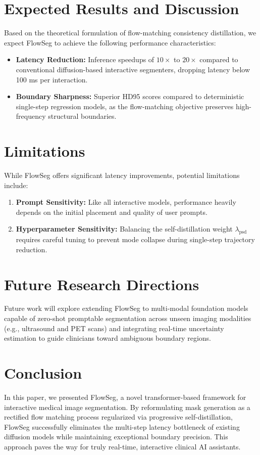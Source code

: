 \documentclass[10.1005,journal]{IEEEtran}
\begin{document}
\section{Expected Results and Discussion}
Based on the theoretical formulation of flow-matching consistency distillation, we expect FlowSeg to achieve the following performance characteristics:
\begin{itemize}
    \item \textbf{Latency Reduction:} Inference speedups of $10\times$ to $20\times$ compared to conventional diffusion-based interactive segmenters, dropping latency below 100 ms per interaction.
    \item \textbf{Boundary Sharpness:} Superior HD95 scores compared to deterministic single-step regression models, as the flow-matching objective preserves high-frequency structural boundaries.
\end{itemize}

\section{Limitations}
While FlowSeg offers significant latency improvements, potential limitations include:
\begin{enumerate}
    \item \textbf{Prompt Sensitivity:} Like all interactive models, performance heavily depends on the initial placement and quality of user prompts.
    \item \textbf{Hyperparameter Sensitivity:} Balancing the self-distillation weight $\lambda_{\text{psd}}$ requires careful tuning to prevent mode collapse during single-step trajectory reduction.
\end{enumerate}

\section{Future Research Directions}
Future work will explore extending FlowSeg to multi-modal foundation models capable of zero-shot promptable segmentation across unseen imaging modalities (e.g., ultrasound and PET scans) and integrating real-time uncertainty estimation to guide clinicians toward ambiguous boundary regions.

\section{Conclusion}
In this paper, we presented FlowSeg, a novel transformer-based framework for interactive medical image segmentation. By reformulating mask generation as a rectified flow matching process regularized via progressive self-distillation, FlowSeg successfully eliminates the multi-step latency bottleneck of existing diffusion models while maintaining exceptional boundary precision. This approach paves the way for truly real-time, interactive clinical AI assistants.
\end{document}
